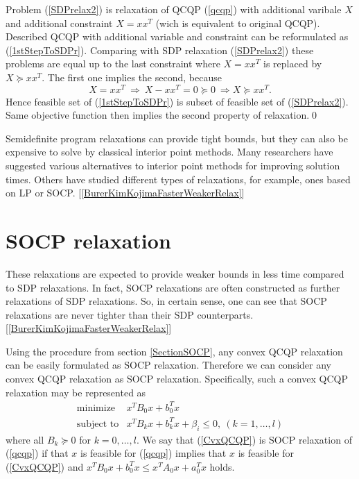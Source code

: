 \documentclass[10pt,oneside]{book}
\theoremstyle{definition}
\begin{document}
\prop Problem (\ref{SDPrelax2}) is relaxation of QCQP (\ref{qcqp}) with additional varibale $X$ and additional constraint $X=xx^T$ (wich is equivalent to original QCQP).
\proof Described QCQP with additional variable and constraint can be reformulated as (\ref{1stStepToSDPr}). Comparing with SDP relaxation (\ref{SDPrelax2}) these problems are equal up to the last constraint where $X=xx^T$ is replaced by $X\succeq xx^T$. The first one implies the second, because $$X=xx^T \ \Rightarrow \ X-xx^T = 0 \succeq 0 \ \Rightarrow X\succeq xx^T.$$  Hence feasible set of (\ref{1stStepToSDPr}) is subset of feasible set of (\ref{SDPrelax2}). Same objective function then implies the second property of relaxation.\qed   

\bigskip 

Semidefinite program relaxations can provide tight bounds, but they can also be expensive to solve by classical interior point methods.
Many researchers have suggested various alternatives to interior point methods for improving solution times. Others have studied different types of relaxations, for example, ones based on LP or SOCP. [\ref{BurerKimKojimaFasterWeakerRelax}]

\section{SOCP relaxation}
These relaxations are expected to provide weaker bounds in less time compared to SDP relaxations. In fact, SOCP relaxations are often constructed as further relaxations of SDP relaxations. So, in certain sense, one can see that SOCP relaxations are never tighter than their SDP counterparts. [\ref{BurerKimKojimaFasterWeakerRelax}]

Using the procedure from section \ref{SectionSOCP}, any convex QCQP relaxation can be easily formulated as SOCP relaxation. Therefore we can consider any convex QCQP relaxation as SOCP relaxation. 
Specifically, such a convex QCQP relaxation may be represented as 
\begin{equation}
\label{CvxQCQP} 
\begin{array}{ll}
\mbox{minimize}& x^TB_0x + b_0^Tx \\
\mbox{subject to}& x^TB_kx + b_k^Tx + \beta_i \leq 0, \  (k = 1,\dots ,l)
\end{array} 
\end{equation}
where all $B_k\succeq 0$ for $k=0,\dots ,l$. We say that (\ref{CvxQCQP}) is SOCP relaxation of (\ref{qcqp}) if that $x$ is feasible for (\ref{qcqp}) implies that $x$ is feasible for (\ref{CvxQCQP}) and $x^TB_0x+b_0^Tx \leq x^TA_0x+a_0^Tx$ holds.
\end{document}
